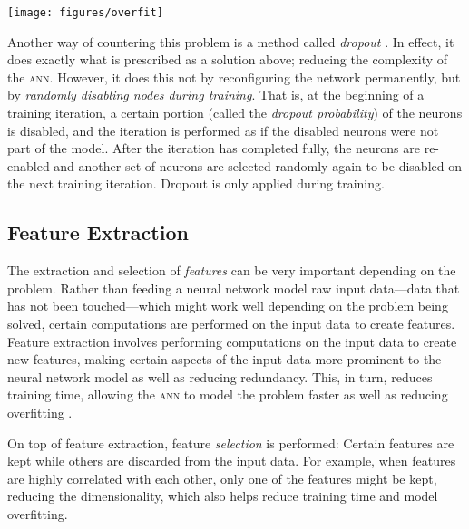 \begin{multicols}{2}
\begin{Figure}
  \texttt{[image: figures/overfit]}
\end{Figure}

\noindent Another way of countering this problem is a method called
\textit{dropout} \citep{hinton2014}.  In effect, it does exactly what is
prescribed as a solution above; reducing the complexity of the \textsc{ann}.
However, it does this not by reconfiguring the network permanently, but by
\textit{randomly disabling nodes during training}.  That is, at the beginning of
a training iteration, a certain portion (called the \textit{dropout
  probability}) of the neurons is disabled, and the iteration is performed as if
the disabled neurons were not part of the model.  After the iteration has
completed fully, the neurons are re-enabled and another set of neurons are
selected randomly again to be disabled on the next training iteration.  Dropout
is only applied during training.

\subsection{Feature Extraction}

The extraction and selection of \textit{features} can be very important
depending on the problem.  Rather than feeding a neural network model raw input
data---data that has not been touched---which might work well depending on the
problem being solved, certain computations are performed on the input data to
create features.  Feature extraction involves performing computations on the
input data to create new features, making certain aspects of the input data more
prominent to the neural network model as well as reducing redundancy.  This, in
turn, reduces training time, allowing the \textsc{ann} to model the problem
faster as well as reducing overfitting \citep{bermingham2015application}.

On top of feature extraction, feature \textit{selection} is performed: Certain
features are kept while others are discarded from the input data.  For example,
when features are highly correlated with each other, only one of the features
might be kept, reducing the dimensionality, which also helps reduce training
time and model overfitting.


\end{multicols}
